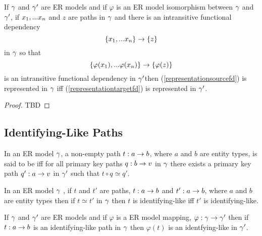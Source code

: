 \begin{lemma}
If $\gamma$ and $\gamma'$ are ER models and  if  $\varphi$ is an ER model isomorphism between $\gamma$  and $\gamma'$,  if $x_1,...x_n$ and $z$ are paths in $\gamma$
and there is an  intransitive functional dependency
\begin{equation}
\label{representationsourcefd}
\left\{x_1,...x_n\right\} \rightarrow \left\{z\right\}
\end{equation} 
in $\gamma$
so that
\begin{equation}
\label{representationtargetfd}
\left\{\varphi(x_1),...\varphi(x_n)\right\} \rightarrow \left\{\varphi(z)\right\}
\end{equation}
is an intransitive  functional dependency in $\gamma'$then
(\ref{representationsourcefd}) is represented in $\gamma$ iff
(\ref{representationtargetfd}) is represented in $\gamma'$.
\end{lemma}
\begin{proof}
TBD
\end{proof}

\subsection{Identifying-Like Paths}

\begin{definition}
In an ER model $\gamma$, a non-empty path $t: a \rightarrow b$, where $a$ and $b$ are entity types, is said to be  iff  for all primary key paths $q:b \rightarrow v$ in $\gamma$ there exists a primary key path $q':a \rightarrow v$ in $\gamma'$ such that $t \circ q \simeq q'$.
\end{definition}

\begin{lemma}
In an ER model $\gamma$ , if $t$ and $t'$ are paths, $t:a \rightarrow b$ and $t':a \rightarrow b$, where $a$ and $b$ are entity types
then if $t \simeq t'$ in $\gamma$ then $t$ is identifying-like iff $t'$ is identifying-like.
\end{lemma}


 
\begin{lemma}
If $\gamma$ and $\gamma'$ are ER models and  if  $\varphi$ is a ER model mapping, $\varphi: \gamma \rightarrow \gamma'$ then if $t:a \rightarrow b$ is an identifying-like  path in $\gamma$ then $\varphi(t)$ is an identfying-like in $\gamma'$.
\end{lemma}

